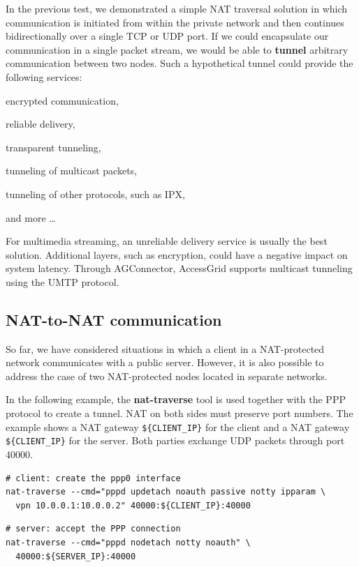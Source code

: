 In the previous test, we demonstrated a simple NAT traversal solution in which communication is initiated from within the private network and then continues bidirectionally over a single TCP or UDP port.
If we could encapsulate our communication in a single packet stream, we would be able to \textbf{tunnel} arbitrary communication between two nodes.
Such a hypothetical tunnel could provide the following services:
\begin{paklist}
\item encrypted communication,
\item reliable delivery,
\item transparent tunneling,
\item tunneling of multicast packets,
\item tunneling of other protocols, such as IPX,
\item and more \ldots
\end{paklist}

For multimedia streaming, an unreliable delivery service is usually the best solution. Additional layers, such as encryption, could have a negative impact on system latency.
Through AGConnector, AccessGrid supports multicast tunneling using the UMTP protocol.

\subsection{NAT-to-NAT communication}

So far, we have considered situations in which a client in a NAT-protected network communicates with a public server.
However, it is also possible to address the case of two NAT-protected nodes located in separate networks.

In the following example, the \textbf{nat-traverse} tool is used together with the PPP protocol to create a tunnel. NAT on both sides must preserve port numbers.
The example shows a NAT gateway \verb|${CLIENT_IP}| for the client and a NAT gateway \verb|${CLIENT_IP}| for the server.
Both parties exchange UDP packets through port 40000.

\begin{verbatim}
# client: create the ppp0 interface
nat-traverse --cmd="pppd updetach noauth passive notty ipparam \
  vpn 10.0.0.1:10.0.0.2" 40000:${CLIENT_IP}:40000
\end{verbatim}

\begin{verbatim}
# server: accept the PPP connection
nat-traverse --cmd="pppd nodetach notty noauth" \
  40000:${SERVER_IP}:40000
\end{verbatim}

